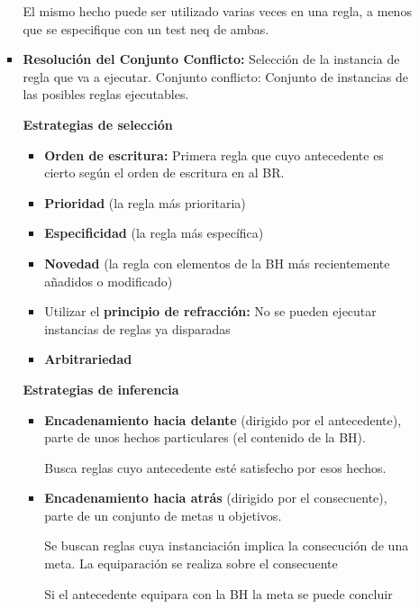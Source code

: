 \documentclass[12pt, twoside, openright]{report} %
\begin{document}
\begin{itemize}
\begin{itemize}
\begin{itemize}
			                  El mismo hecho puede ser utilizado varias veces en una regla, a menos que se especifique con un test neq de ambas.

			            \item \textbf{Resolución del Conjunto Conflicto:} Selección de la instancia de regla que va a ejecutar.
			                  Conjunto conflicto: Conjunto de instancias de las posibles reglas ejecutables.

			                  \textbf{Estrategias de selección}
			                  \begin{itemize}
				                  \item \textbf{Orden de escritura:} Primera regla que cuyo antecedente es cierto según el orden de escritura en al BR.
				                  \item \textbf{Prioridad} (la regla más prioritaria)
				                  \item \textbf{Especificidad} (la regla más específica)
				                  \item \textbf{Novedad} (la regla con elementos de la BH más recientemente añadidos o modificado)
				                  \item Utilizar el \textbf{principio de refracción:} No se pueden ejecutar instancias de reglas ya disparadas
				                  \item \textbf{Arbitrariedad}
			                  \end{itemize}

			                  \textbf{Estrategias de inferencia}
			                  \begin{itemize}
				                  \item \textbf{Encadenamiento hacia delante} (dirigido por el antecedente), parte de unos hechos particulares (el contenido de la BH).

				                        Busca reglas cuyo antecedente esté satisfecho por esos hechos.
				                  \item \textbf{Encadenamiento hacia atrás} (dirigido por el consecuente), parte de un conjunto de metas u objetivos.

				                        Se buscan reglas cuya instanciación implica la consecución de una meta. La
				                        equiparación se realiza sobre el consecuente

				                        Si el antecedente equipara con la BH la meta se puede concluir
			                  \end{itemize}


\end{itemize}
\end{itemize}
\end{itemize}
\end{document}
